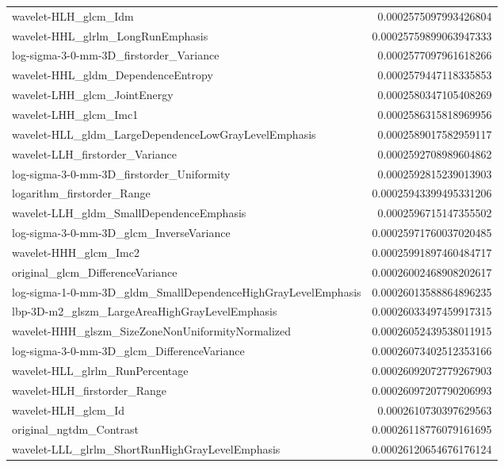 {\begin{xltabular}[H]{\textwidth}{X r}
        wavelet-HLH\_glcm\_Idm & 0.0002575097993426804 \\
        wavelet-HHL\_glrlm\_LongRunEmphasis & 0.00025759899063947333 \\
        log-sigma-3-0-mm-3D\_firstorder\_Variance & 0.0002577097961618266 \\
        wavelet-HHL\_gldm\_DependenceEntropy & 0.0002579447118335853 \\
        wavelet-LHH\_glcm\_JointEnergy & 0.0002580347105408269 \\
        wavelet-LHH\_glcm\_Imc1 & 0.0002586315818969956 \\
        wavelet-HLL\_gldm\_LargeDependenceLowGrayLevelEmphasis & 0.0002589017582959117 \\
        wavelet-LLH\_firstorder\_Variance & 0.0002592708989604862 \\
        log-sigma-3-0-mm-3D\_firstorder\_Uniformity & 0.0002592815239013903 \\
        logarithm\_firstorder\_Range & 0.00025943399495331206 \\
        wavelet-LLH\_gldm\_SmallDependenceEmphasis & 0.0002596715147355502 \\
        log-sigma-3-0-mm-3D\_glcm\_InverseVariance & 0.00025971760037020485 \\
        wavelet-HHH\_glcm\_Imc2 & 0.00025991897460484717 \\
        original\_glcm\_DifferenceVariance & 0.00026002468908202617 \\
        log-sigma-1-0-mm-3D\_gldm\_SmallDependenceHighGrayLevelEmphasis & 0.00026013588864896235 \\
        lbp-3D-m2\_glszm\_LargeAreaHighGrayLevelEmphasis & 0.00026033497459917315 \\
        wavelet-HHH\_glszm\_SizeZoneNonUniformityNormalized & 0.00026052439538011915 \\
        log-sigma-3-0-mm-3D\_glcm\_DifferenceVariance & 0.00026073402512353166 \\
        wavelet-HLL\_glrlm\_RunPercentage & 0.00026092072779267903 \\
        wavelet-HLH\_firstorder\_Range & 0.00026097207790206993 \\
        wavelet-HLH\_glcm\_Id & 0.0002610730397629563 \\
        original\_ngtdm\_Contrast & 0.00026118776079161695 \\
        wavelet-LLL\_glrlm\_ShortRunHighGrayLevelEmphasis & 0.00026120654676176124 \\

\end{xltabular}}
